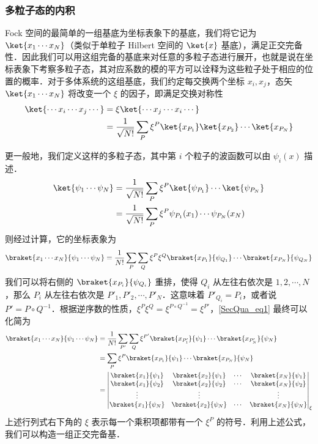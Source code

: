 \subsubsection{多粒子态的内积}
Fock 空间的最简单的一组基底为坐标表象下的基底，我们将它记为 $\ket{x_1\cdots x_N}$（类似于单粒子 Hilbert 空间的 $\ket{x}$ 基底），满足正交完备性．因此我们可以用这组完备的基底来对任意的多粒子态进行展开，也就是说在坐标表象下考察多粒子态，其对应系数的模的平方可以诠释为这些粒子处于相应的位置的概率．对于多体系统的这组基底，我们约定每交换两个坐标 $x_i,x_j$，态矢 $\ket{x_1\cdots x_N}$ 将改变一个 $\xi$ 的因子，即满足交换对称性
\begin{equation}
\begin{aligned}
\ket{\cdots x_i \cdots x_j \cdots}& =
\xi \ket{\cdots x_j \cdots x_i \cdots} \\
&=\frac{1}{\sqrt{N!}}\sum_P \xi^P\ket{x_{P_1}}\ket{x_{P_2}}\cdots\ket{x_{P_N}}
\end{aligned}
\end{equation}

更一般地，我们定义这样的多粒子态，其中第 $i$ 个粒子的波函数可以由 $\psi_i(x)$ 描述．
\begin{equation}
\begin{aligned}
\ket{\psi_1\cdots\psi_N}&=\frac{1}{\sqrt{N!}}\sum_P \xi^P\ket{\psi_{P_1}}\cdots \ket{\psi_{P_N}}\\
&=\frac{1}{\sqrt{N!}}\sum_P \xi^P\psi_{P_1}(x_1)\cdots \psi_{P_N}(x_N)
\end{aligned}
\end{equation}
则经过计算，它的坐标表象为
\begin{equation}\label{SecQua_eq1}
\braket{x_1\cdots x_N}{\psi_1\cdots\psi_N}=\frac{1}{N!}\sum_P\sum_Q \xi^P \xi^Q \braket{x_{P_1}}{\psi_{Q_1}}\cdots\braket{x_{P_N}}{\psi_{Q_N}}
\end{equation}
我们可以将右侧的 $\braket{x_{P_i}}{\psi_{Q_i}}$ 重排，使得 $Q_i$ 从左往右依次是 $1,2,\cdots,N$，那么 $P_i$ 从左往右依次是 $P'_1,P'_2,\cdots,P'_N$．这意味着 $P'_{Q_i}=P_i$，或者说 $P'=P\circ Q^{-1}$．根据逆序数的性质，$\xi^P\xi^Q=\xi^{P\circ Q^{-1}}=\xi^{P'}$，\autoref{SecQua_eq1}  最终可以化简为
\begin{equation}
\begin{aligned}
\braket{x_1\cdots x_N}{\psi_1\cdots\psi_N}&=\frac{1}{N!}\sum_{P'}\sum_Q \xi^{P'} \braket{x_{P'_1}}{\psi_{1}}\cdots\braket{x_{P'_N}}{\psi_{N}}\\
&=\sum_{P}\xi^P\braket{x_{P_1}}{\psi_{1}}\cdots\braket{x_{P_N}}{\psi_{N}}\\
&=\left|\begin{matrix}
\braket{x_1}{\psi_1} &\braket{x_2}{\psi_1} &\cdots &\braket{x_N}{\psi_1}\\
\braket{x_1}{\psi_2} &\braket{x_2}{\psi_2} &\cdots & \braket{x_N}{\psi_2}\\
\vdots & \vdots & & \vdots \\
\braket{x_1}{\psi_N} &\braket{x_2}{\psi_N} &\cdots & \braket{x_N}{\psi_N}
\end{matrix}\right|_\xi
\end{aligned}
\end{equation}
上述行列式右下角的 $\xi$ 表示每一个乘积项都带有一个 $\xi^P$ 的符号．利用上述公式，我们可以构造一组正交完备基．

